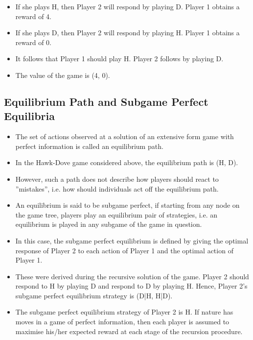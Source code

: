 \documentclass[]{report}
\begin{document}
\begin{itemize}
	\item If she plays H, then Player 2 will respond by playing D. Player 1
	obtains a reward of 4.
	\item 	If she plays D, then Player 2 will respond by playing H. Player 1
	obtains a reward of 0.
	\item 	It follows that Player 1 should play H. Player 2 follows by playing
	D.
	\item 	The value of the game is (4, 0).
	
\end{itemize}

\subsection{Equilibrium Path and Subgame Perfect Equilibria}
\begin{itemize}
\item The set of actions observed at a solution of an extensive form
	game with perfect information is called an equilibrium path.
\item In the Hawk-Dove game considered above, the equilibrium path is
	(H, D).
\item However, such a path does not describe how players should react to
	”mistakes”, i.e. how should individuals act off the equilibrium path.
\item An equilibrium is said to be subgame perfect, if starting from any
	node on the game tree, players play an equilibrium pair of
	strategies, i.e. an equilibrium is played in any subgame of the game
	in question.
\end{itemize}


\begin{itemize}
\item In this case, the subgame perfect equilibrium is defined by giving
the optimal response of Player 2 to each action of Player 1 and the
optimal action of Player 1.
\item These were derived during the recursive solution of the game.
Player 2 should respond to H by playing D and respond to D by
playing H. Hence, Player 2’s subgame perfect equilibrium strategy
is (D|H, H|D).
\item The subgame perfect equilibrium strategy of Player 2 is H.
If nature has moves in a game of perfect information, then each
player is assumed to maximise his/her expected reward at each
stage of the recursion procedure.

\end{itemize}
\end{document}
